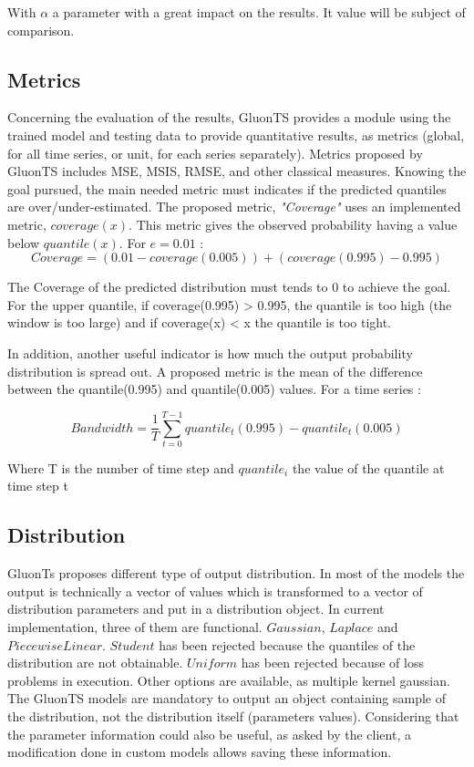\documentclass[a4paper, 12pt]{article}
\begin{document}
With $\alpha$ a parameter with a great impact on the results. It value will be subject of comparison.

  
  
\subsection{Metrics} \label{metrics}

Concerning the evaluation of the results, GluonTS provides a module using the trained model and testing data to provide quantitative results, as metrics (global, for all time series, or unit, for each series separately). Metrics proposed by GluonTS includes MSE, MSIS, RMSE, and other classical measures.
Knowing the goal pursued, the main needed metric must indicates if the predicted quantiles are over/under-estimated. 
The proposed 
metric, \textit{"Coverage"} uses an implemented metric, $coverage(x)$.
This metric gives the observed probability having a value below $quantile(x)$.
For $e=0.01$ :  
\begin{equation}
    Coverage = (0.01 - coverage(0.005)) + (coverage(0.995) - 0.995) 
\end{equation}

The Coverage of the predicted distribution must tends to 0 to achieve the goal. For the upper quantile,
if coverage(0.995) > 0.995, the quantile is too high (the window is too large) and
if coverage(x) < x the quantile is too tight.


In addition, another useful indicator is how much the output probability distribution is spread out. 
A proposed metric is  the mean of the difference between 
the quantile(0.995) and quantile(0.005) values. For a time series :

\begin{equation}
    Bandwidth = \frac{1}{T}  \sum_{t=0}^{T-1} quantile_{t}(0.995) - quantile_{t}(0.005) 
\end{equation}


Where T is the number of time step and $quantile_{i}$ the value of the quantile at time step t


\subsection{Distribution}\label{distribution}

GluonTs proposes different type of output distribution. In most of the models the output is technically
 a vector of values which is
transformed to a vector of distribution parameters  and put in a distribution object.
In current implementation, three of them are functional. $Gaussian$, $Laplace$ and $PiecewiseLinear$.
$Student$ has been rejected because the quantiles of the distribution are not obtainable.
$Uniform$ has been rejected because of loss problems in execution.
Other options are available, as multiple kernel gaussian.
The GluonTS models are mandatory to output an object containing sample of the distribution, not the distribution itself (parameters values). Considering that the parameter information could also be useful, as asked by the client, a modification done in custom models allows saving these information.
\end{document}
